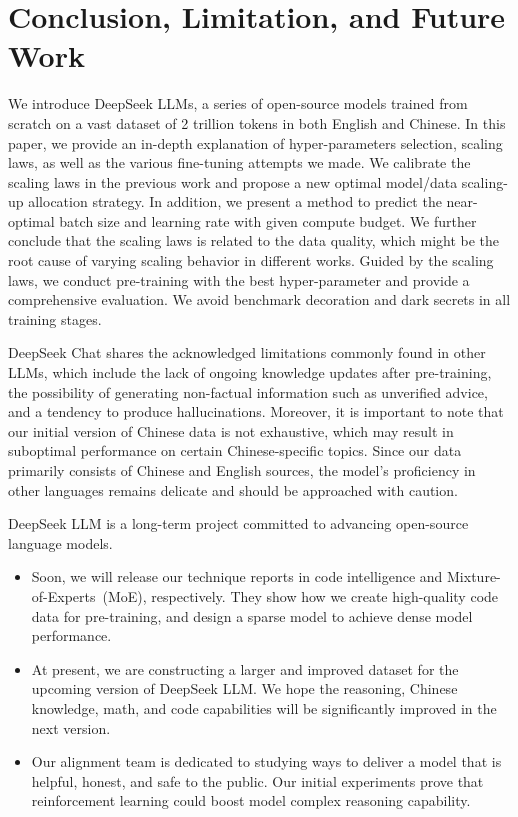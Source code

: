 \section{Conclusion, Limitation, and Future Work}
\label{sec:conclusion}

We introduce DeepSeek LLMs, a series of open-source models trained from scratch on a vast dataset of 2 trillion tokens in both English and Chinese.  In this paper, we provide an in-depth explanation of hyper-parameters selection, scaling laws, as well as the various fine-tuning attempts we made. We calibrate the scaling laws in the previous work and propose a new optimal model/data scaling-up allocation strategy. In addition, we present a method to predict the near-optimal batch size and learning rate with given compute budget. We further conclude that the scaling laws is related to the data quality, which might be the root cause of varying scaling behavior in different works. Guided by the scaling laws, we conduct pre-training with the best hyper-parameter and provide a comprehensive evaluation. We avoid benchmark decoration and dark secrets in all training stages.

DeepSeek Chat shares the acknowledged limitations commonly found in other LLMs, which include the lack of ongoing knowledge updates after pre-training, the possibility of generating non-factual information such as unverified advice, and a tendency to produce hallucinations. Moreover, it is important to note that our initial version of Chinese data is not exhaustive, which may result in suboptimal performance on certain Chinese-specific topics. Since our data primarily consists of Chinese and English sources, the model's proficiency in other languages remains delicate and should be approached with caution. 

DeepSeek LLM is a long-term project committed to advancing open-source language models.

\begin{itemize}
    \item Soon, we will release our technique reports in code intelligence and  Mixture-of-Experts~(MoE), respectively. They show how we create high-quality code data for pre-training, and design a sparse model to achieve dense model performance. 
    \item At present, we are constructing a larger and improved dataset for the upcoming version of DeepSeek LLM. We hope the reasoning, Chinese knowledge, math, and code capabilities will be significantly improved in the next version.  
    \item Our alignment team is dedicated to studying ways to deliver a model that is helpful, honest, and safe to the public. Our initial experiments prove that reinforcement learning could boost model complex reasoning capability.

\end{itemize}


